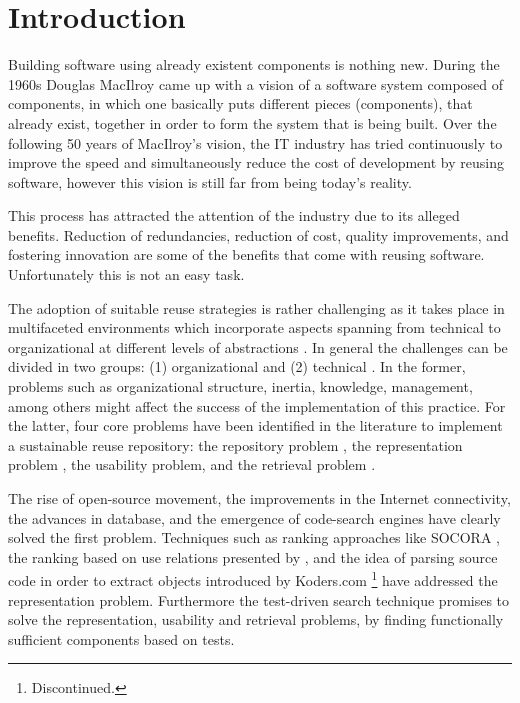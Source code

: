 \chapter{Introduction}
\label{chap:introduction}
Building software using already existent components is nothing new. During the 1960s Douglas MacIlroy came up with a vision of a software system composed of components, in which one basically puts different pieces (components), that already exist, together in order to form the system that is being built. Over the following 50 years of MacIlroy's vision, the IT industry has tried continuously to improve the speed and simultaneously reduce the cost of development by reusing software, however this vision is still far from being today's reality.

This process has attracted the attention of the industry due to its alleged benefits. Reduction of redundancies, reduction of cost, quality improvements, and fostering innovation are some of the benefits that come with reusing software. Unfortunately this is not an easy task.

The adoption of suitable reuse strategies is rather challenging as it takes place in multifaceted environments which incorporate aspects spanning from technical to organizational at different levels of abstractions \cite{Bauer2016}. In general the challenges can be divided in two groups: (1) organizational and (2) technical \cite{Hummel2013,Bauer2016}. In the former, problems such as organizational structure, inertia, knowledge, management, among others might affect the success of the implementation of this practice. For the latter, four core problems have been identified in the literature to implement a sustainable reuse repository: the repository problem \cite{Seacord1999}, the representation problem \cite{Pole1994}, the usability problem\cite{Garcia2006}, and the retrieval problem \cite{Prieto-Diaz1987}.

The rise of open-source movement, the improvements in the Internet connectivity, the advances in database, and the emergence of code-search engines have clearly solved the first problem. Techniques such as ranking approaches like SOCORA \cite{Kessel2016}, the ranking based on use relations presented by \citeauthor{Inoue2005}, and the idea of parsing source code in order to extract objects introduced by Koders.com \footnote{Discontinued.} have addressed the representation problem. Furthermore the test-driven search technique \cite{Hummel2004,Hummel2013} promises to solve the representation, usability and retrieval problems, by finding functionally sufficient components based on tests.

